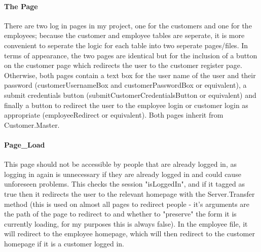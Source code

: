 ﻿\documentclass{article}
\begin{document}
    \paragraph{The Page}
    There are two log in pages in my project, one for the customers and one for the employees; because the customer and employee tables are seperate, it is more convenient to seperate the logic for each table into two seperate pages/files.
    In terms of appearance, the two pages are identical but for the inclusion of a button on the customer page which redirects the user to the customer register page.
    Otherwise, both pages contain a text box for the user name of the user and their password (customerUsernameBox and customerPasswordBox or equivalent), a submit credentials button (submitCustomerCredentialsButton or equivalent) and finally a button to redirect the user to the employee login or customer login as appropriate (employeeRedirect or equivalent).
    Both pages inherit from Customer.Master.
    \paragraph{Page\_Load}
    This page should not be accessible by people that are already logged in, as logging in again is unnecessary if they are already logged in and could cause unforeseen problems.
    This checks the session "isLoggedIn", and if it tagged as true then it redirects the user to the relevant homepage with the Server.Transfer method (this is used on almost all pages to redirect people - it's arguments are the path of the page to redirect to and whether to "preserve" the form it is currently loading, for my purposes this is always false).
    In the employee file, it will redirect to the employee homepage, which will then redirect to the customer homepage if it is a customer logged in.
\end{document}
